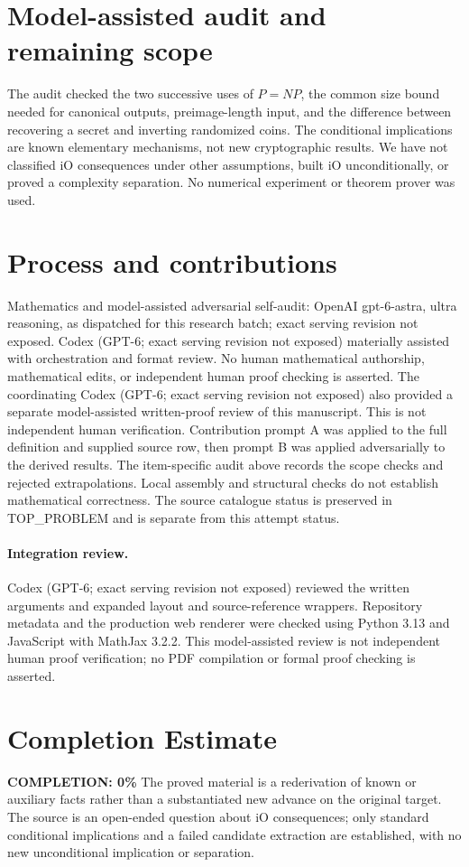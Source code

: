 \documentclass[11pt]{article}
\begin{document}
\section{Model-assisted audit and remaining scope}
The audit checked the two successive uses of $P=NP$, the common size
bound needed for canonical outputs, preimage-length input, and the
difference between recovering a secret and inverting randomized coins.
The conditional implications are known elementary mechanisms, not new
cryptographic results. We have not classified iO consequences under
other assumptions, built iO unconditionally, or proved a complexity
separation. No numerical experiment or theorem prover was used.

\section{Process and contributions}
Mathematics and model-assisted adversarial self-audit: OpenAI gpt-6-astra, ultra reasoning, as dispatched for this research batch; exact serving revision not exposed. Codex (GPT-6; exact serving revision not exposed) materially assisted with orchestration and format review. No human mathematical authorship, mathematical edits, or independent human proof checking is asserted.
The coordinating Codex (GPT-6; exact serving revision not exposed) also provided a separate model-assisted written-proof review of this manuscript. This is not independent human verification.
Contribution prompt A was applied to the full definition and supplied source row, then prompt B was applied adversarially to the derived results. The item-specific audit above records the scope checks and rejected extrapolations. Local assembly and structural checks do not establish mathematical correctness. The source catalogue status is preserved in TOP\_PROBLEM and is separate from this attempt status.
\paragraph{Integration review.} Codex (GPT-6; exact serving revision not exposed) reviewed the written arguments and expanded layout and source-reference wrappers. Repository metadata and the production web renderer were checked using Python 3.13 and JavaScript with MathJax 3.2.2. This model-assisted review is not independent human proof verification; no PDF compilation or formal proof checking is asserted.

\section{Completion Estimate}
\noindent\textbf{COMPLETION: 0\%}
The proved material is a rederivation of known or auxiliary facts rather than a substantiated new advance on the original target. The source is an open-ended question about iO consequences; only standard conditional implications and a failed candidate extraction are established, with no new unconditional implication or separation.
\end{document}

